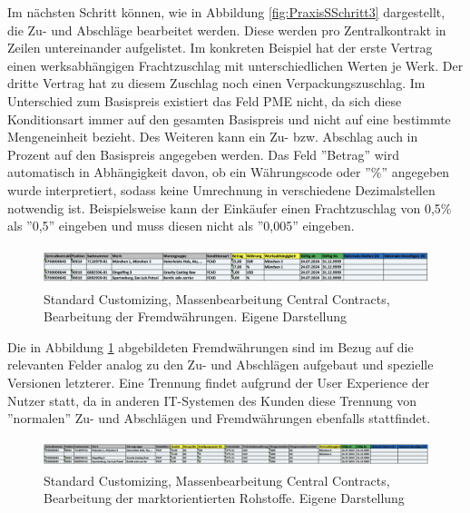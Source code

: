 Im nächsten Schritt können, wie in Abbildung \ref{fig:PraxisSSchritt3} dargestellt, die Zu- und Abschläge bearbeitet werden. Diese werden pro Zentralkontrakt in Zeilen untereinander aufgelistet. Im konkreten Beispiel hat der erste Vertrag einen werksabhängigen Frachtzuschlag mit unterschiedlichen Werten je Werk. Der dritte Vertrag hat zu diesem Zuschlag noch einen Verpackungszuschlag. Im Unterschied zum Basispreis existiert das Feld PME nicht, da sich diese Konditionsart immer auf den gesamten Basispreis und nicht auf eine bestimmte Mengeneinheit bezieht. Des Weiteren kann ein Zu- bzw. Abschlag auch in Prozent auf den Basispreis angegeben werden. Das Feld ''Betrag'' wird automatisch in Abhängigkeit davon, ob ein Währungscode oder ''\%'' angegeben wurde interpretiert, sodass keine Umrechnung in verschiedene Dezimalstellen notwendig ist. Beispielsweise kann der Einkäufer einen Frachtzuschlag von 0,5\% als ''0,5'' eingeben und muss diesen nicht als ''0,005'' eingeben.

\begin{figure}[H]
    \centering
    \includegraphics[height=1.12cm]{Bilder/Praxisteil-S-Schritt-4.png}
    \caption[Standard Customizing, Massenbearbeitung Central Contracts, Bearbeitung der Fremdwährungen]{Standard Customizing, Massenbearbeitung Central Contracts, Bearbeitung der Fremdwährungen. Eigene Darstellung}
    \label{fig:PraxisSSchritt4}
\end{figure}

Die in Abbildung \ref{fig:PraxisSSchritt4} abgebildeten Fremdwährungen sind im Bezug auf die relevanten Felder analog zu den Zu- und Abschlägen aufgebaut und spezielle Versionen letzterer. Eine Trennung findet aufgrund der User Experience der Nutzer statt, da in anderen IT-Systemen des Kunden diese Trennung von ''normalen'' Zu- und Abschlägen und Fremdwährungen ebenfalls stattfindet.

\begin{figure}[H]
    \centering
    \includegraphics[height=0.8cm]{Bilder/Praxisteil-S-Schritt-5.png}
    \caption[Standard Customizing, Massenbearbeitung Central Contracts, Bearbeitung der marktorientierten Rohstoffe]{Standard Customizing, Massenbearbeitung Central Contracts, Bearbeitung der marktorientierten Rohstoffe. Eigene Darstellung}
    \label{fig:PraxisSSchritt5}
\end{figure}

